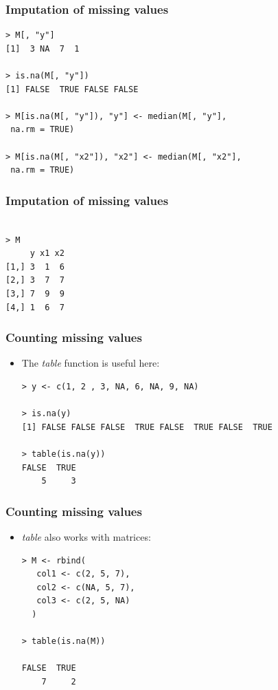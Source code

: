 \documentclass[xcolor=dvipsnames, xcolor=table]{beamer} %
\theoremstyle{mystyle}
\begin{document}
\begin{frame}[fragile] %

\frametitle{Imputation of missing values}

\begin{verbatim} 
> M[, "y"]
[1]  3 NA  7  1

> is.na(M[, "y"])
[1] FALSE  TRUE FALSE FALSE

> M[is.na(M[, "y"]), "y"] <- median(M[, "y"],
 na.rm = TRUE)

> M[is.na(M[, "x2"]), "x2"] <- median(M[, "x2"],
 na.rm = TRUE)

\end{verbatim}

\end{frame}

\begin{frame}[fragile] %

\frametitle{Imputation of missing values}

\begin{verbatim} 

> M
     y x1 x2
[1,] 3  1  6
[2,] 3  7  7
[3,] 7  9  9
[4,] 1  6  7
\end{verbatim}

\end{frame}

\begin{frame}[fragile] %
\frametitle{Counting missing values}

\begin{itemize}
\item The \textit{table} function is useful here:
\begin{verbatim}
> y <- c(1, 2 , 3, NA, 6, NA, 9, NA)

> is.na(y)
[1] FALSE FALSE FALSE  TRUE FALSE  TRUE FALSE  TRUE

> table(is.na(y))
FALSE  TRUE 
    5     3 
\end{verbatim}
\end{itemize}

\end{frame}

\begin{frame}[fragile] %
\frametitle{Counting missing values}

\begin{itemize}
\item  \textit{table} also works with matrices:
\begin{verbatim}
> M <- rbind(
   col1 <- c(2, 5, 7),
   col2 <- c(NA, 5, 7),
   col3 <- c(2, 5, NA)
  )

> table(is.na(M))

FALSE  TRUE 
    7     2 
\end{verbatim}
\end{itemize}

\end{frame}
\end{document}
